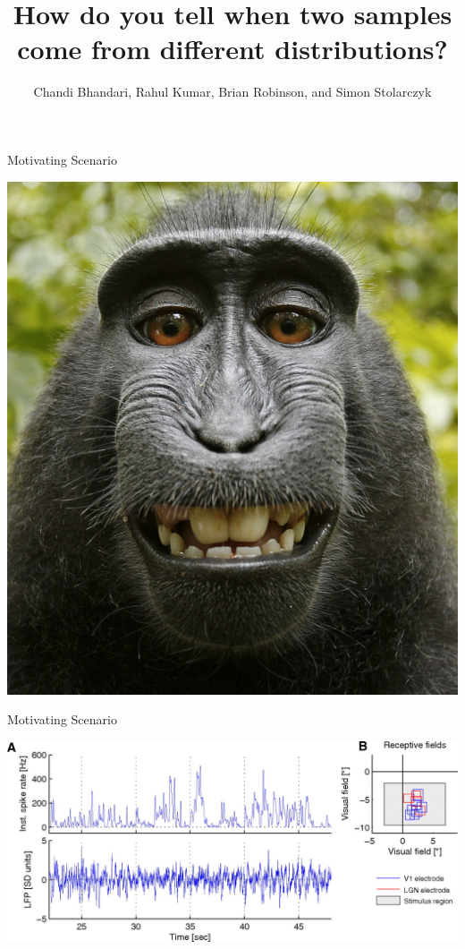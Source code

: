 \documentclass{beamer}
\begin{document}
\title[Two Sample Discrimination]{How do you tell when two samples come from different distributions? }
\author{Chandi Bhandari, Rahul Kumar, Brian Robinson, and Simon Stolarczyk}


\titlepage

\begin{frame}
{Motivating Scenario}

\begin{center}
\includegraphics[scale=.3]{macaque.jpg}
\end{center}

\end{frame}


\begin{frame}
{Motivating Scenario}

\includegraphics[scale=.32]{lfpspike.jpg}
\end{frame}
\end{document}
